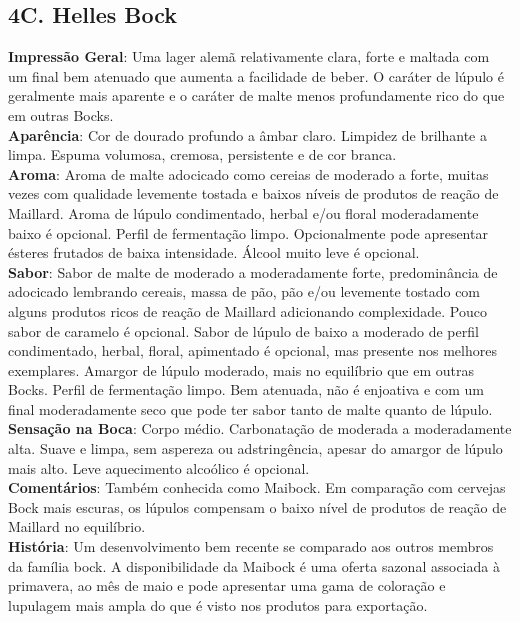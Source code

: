 \subsection*{4C. Helles Bock}
\textbf{Impressão Geral}: Uma lager alemã relativamente clara, forte e maltada com um final bem atenuado que aumenta a facilidade de beber. O caráter de lúpulo é geralmente mais aparente e o caráter de malte menos profundamente rico do que em outras Bocks. \\
\textbf{Aparência}: Cor de dourado profundo a âmbar claro. Limpidez de brilhante a limpa. Espuma volumosa, cremosa, persistente e de cor branca. \\
\textbf{Aroma}: Aroma de malte adocicado como cereias de moderado a forte, muitas vezes com qualidade levemente tostada e baixos níveis de produtos de reação de Maillard. Aroma de lúpulo condimentado, herbal e/ou floral moderadamente baixo é opcional. Perfil de fermentação limpo. Opcionalmente pode apresentar ésteres frutados de baixa intensidade. Álcool muito leve é opcional. \\
\textbf{Sabor}: Sabor de malte de moderado a moderadamente forte, predominância de adocicado lembrando cereais, massa de pão, pão e/ou levemente tostado com alguns produtos ricos de reação de Maillard adicionando complexidade. Pouco sabor de caramelo é opcional. Sabor de lúpulo de baixo a moderado de perfil condimentado, herbal, floral, apimentado é opcional, mas presente nos melhores exemplares. Amargor de lúpulo moderado, mais no equilíbrio que em outras Bocks. Perfil de fermentação limpo. Bem atenuada, não é enjoativa e com um final moderadamente seco que pode ter sabor tanto de malte quanto de lúpulo. \\
\textbf{Sensação na Boca}: Corpo médio. Carbonatação de moderada a moderadamente alta. Suave e limpa, sem aspereza ou adstringência, apesar do amargor de lúpulo mais alto. Leve aquecimento alcoólico é opcional. \\
\textbf{Comentários}: Também conhecida como Maibock. Em comparação com cervejas Bock mais escuras, os lúpulos compensam o baixo nível de produtos de reação de Maillard no equilíbrio. \\
\textbf{História}: Um desenvolvimento bem recente se comparado aos outros membros da família bock. A disponibilidade da Maibock é uma oferta sazonal associada à primavera, ao mês de maio e pode apresentar uma gama de coloração e lupulagem mais ampla do que é visto nos produtos para exportação. \\
